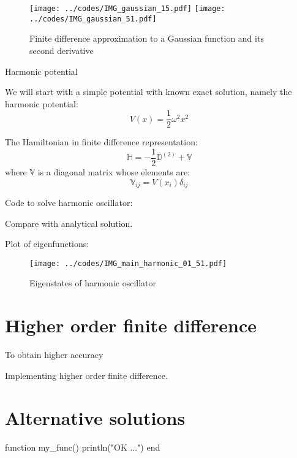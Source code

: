\documentclass[a4paper]{article}
\begin{document}
\begin{figure}[H]
{\center
\texttt{[image: ../codes/IMG\_gaussian\_15.pdf]}
\texttt{[image: ../codes/IMG\_gaussian\_51.pdf]}
\par}
\caption{Finite difference approximation to a Gaussian function and its second derivative}
\end{figure}


Harmonic potential

We will start with a simple potential with known exact solution, namely the harmonic potential:
\begin{equation}
V(x) = \frac{1}{2}\omega^2 x^2
\end{equation}

The Hamiltonian in finite difference representation:
\begin{equation}
\mathbb{H} = -\frac{1}{2}\mathbb{D}^{(2)} + \mathbb{V}
\end{equation}
where $\mathbb{V}$ is a diagonal matrix whose elements are:
\begin{equation}
\mathbb{V}_{ij} = V(x_{i})\delta_{ij}
\end{equation}


Code to solve harmonic oscillator:


Compare with analytical solution.

Plot of eigenfunctions:

\begin{figure}[H]
{\center
\texttt{[image: ../codes/IMG\_main\_harmonic\_01\_51.pdf]}
\par}
\caption{Eigenstates of harmonic oscillator}
\end{figure}


\section{Higher order finite difference}

To obtain higher accuracy

Implementing higher order finite difference.



\appendix

\section{Alternative solutions}

\begin{juliacode}
function my_func()
    println("OK ...")
end
\end{juliacode}
\end{document}
